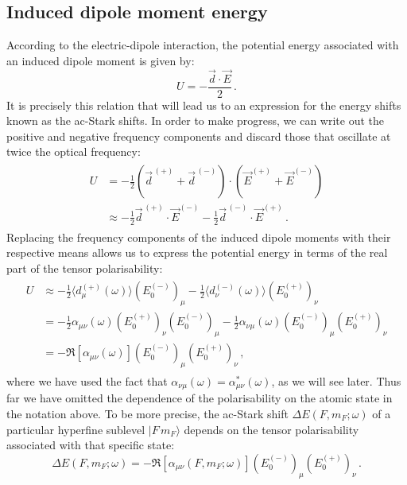 \documentclass[../Thesis-IJspeert.tex]{subfiles}
\begin{document}
\subsection{Induced dipole moment energy}
According to the electric-dipole interaction, the potential energy associated with an induced dipole moment is given by:
\begin{equation}
U = -\frac{\vec{d}\cdot \vec{E}}{2}\,.
\end{equation}
It is precisely this relation that will lead us to an expression for the energy shifts known as the ac-Stark shifts. In order to make progress, we can write out the positive and negative frequency components and discard those that oscillate at twice the optical frequency:
\begin{align}
\begin{split}
U &= -\frac{1}{2}\left( \vec{d}^{\,(+)} + \vec{d}^{\,(-)} \right) \cdot \left( \vec{E}^{(+)} + \vec{E}^{(-)} \right)\\ &\approx -\frac{1}{2} \vec{d}^{\,(+)}\cdot \vec{E}^{(-)} -\frac{1}{2} \vec{d}^{\,(-)} \cdot \vec{E}^{(+)}\,.
\end{split}
\end{align}
Replacing the frequency components of the induced dipole moments with their respective means allows us to express the potential energy in terms of the real part of the tensor polarisability:
\begin{align}
\begin{split}
U &\approx -\frac{1}{2} \langle d_\mu^{(+)}(\omega) \rangle ( E_0^{(-)} )_\mu  -\frac{1}{2} \langle d_\nu^{(-)}(\omega) \rangle ( E_0^{(+)} )_\nu \\&= -\frac{1}{2} \alpha_{\mu \nu}(\omega) ( E_0^{(+)} )_\nu ( E_0^{(-)} )_\mu -\frac{1}{2} \alpha_{\nu \mu}(\omega) ( E_0^{(-)} )_\mu ( E_0^{(+)} )_\nu \\ &= -\Re [ \alpha_{\mu \nu}(\omega) ] ( E_0^{(-)} )_\mu ( E_0^{(+)} )_\nu\,,
\end{split}
\end{align}
where we have used the fact that $\alpha_{\nu \mu}(\omega) = \alpha_{\mu \nu}^*(\omega)$, as we will see later. Thus far we have omitted the dependence of the polarisability on the atomic state in the notation above. To be more precise, the ac-Stark shift $\Delta E(F,m_F;\omega)$ of a particular hyperfine sublevel $\vert F\,m_F \rangle$ depends on the tensor polarisability associated with that specific state:
\begin{equation}
\label{StarkSummary}
	 \Delta E(F,m_F;\omega)=-\Re [ \alpha_{\mu \nu}(F,m_F;\omega) ] ( E_0^{(-)} )_\mu ( E_0^{(+)} )_\nu\,.
\end{equation}
\end{document}
